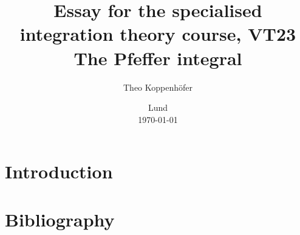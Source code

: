 




\title{ Essay for the specialised integration theory course, VT23 \\[1ex]
	  \large The Pfeffer integral}
\author{Theo Koppenhöfer}
\date{Lund \\[1ex] \today}







\maketitle

\section{Introduction}


\section*{Bibliography}
\nocite{*}
\printbibliography



